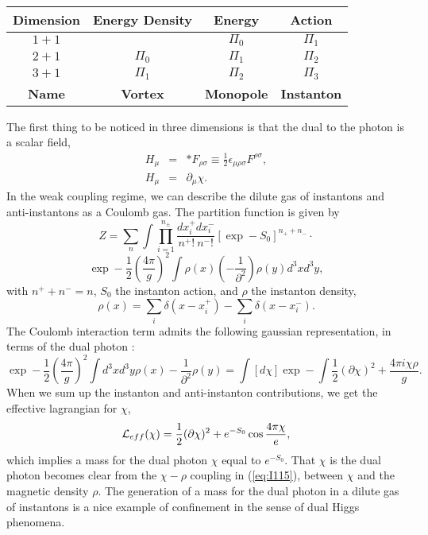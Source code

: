 \begin{center}

\begin{tabular}{|c|c|c|c|}     \hline\hline
	 {\bf Dimension}        & {\bf Energy Density}  &  {\bf Energy}  & {\bf Action}  \\ \hline
	 $1+1$                  &                       &  $\Pi_0$       & $\Pi_1$  \\ 
	 $2+1$                  & $\Pi_0$               &  $\Pi_1$       & $\Pi_2$  \\  
	 $3+1$                  & $\Pi_1$               &  $\Pi_2$       & $\Pi_3$  \\  \hline
	 {\bf Name}             & {\bf Vortex}          & {\bf Monopole} & {\bf Instanton} \\ \hline\hline


\end{tabular}
\label{tab:1}
\end{center}

  
The first thing to be noticed in three dimensions is that the
dual to the photon is a scalar field,
\begin{eqnarray}
H_{\mu} & = & * F_{\rho \sigma} \equiv \frac {1}{2}\epsilon_{\mu \rho
\sigma} F^{\rho \sigma}, \nonumber \\
H_{\mu} & = & \partial_{\mu}\chi.
\label{eq:I112}
\end{eqnarray}
In the weak coupling regime, we can describe the dilute gas of
instantons and anti-instantons as a Coulomb gas. The partition
function is given by \cite{P3d}
\[
Z= \sum_{n} \int \prod_{i=1}^{n_{\pm}} \frac {dx_i^+ dx_i^-}{n^+ ! \: n^- !}
[\exp - S_0]^{n_++n_-} \cdot \]
\begin{equation}
\exp - \frac {1}{2} \left( \frac {4\pi}{g} \right)^2 \int \rho(x)
\left( - \frac {1}{\partial^2} \right) \rho(y) d^3x d^3y,
\label{eq:I113}
\end{equation}
with $n^++n^-=n$, $S_0$ the instanton action, and $\rho$ the
instanton density,
\begin{equation}
\rho(x) = \sum_i \delta(x-x_i^+) - \sum_i \delta (x-x_i^-).
\label{eq:I114}
\end{equation}
The Coulomb interaction term admits the following gaussian
representation, in terms of the dual photon \cite{P3d}:
\begin{equation}
\exp - \frac {1}{2} \left( \frac {4\pi}{g} \right)^2 \int d^3x d^3y
\rho(x) - \frac {1}{\partial^2}\rho(y) = \int [d\chi] \exp - \int
\frac {1}{2} (\partial \chi)^2 + \frac {4\pi i\chi \rho}{g}.
\label{eq:I115}
\end{equation}
When we sum up the instanton and anti-instanton contributions, we
get the effective lagrangian for $\chi$,
\begin{equation}
{\cal L}_{eff}(\chi) = \frac {1}{2} (\partial \chi)^2+e^{-S_0}
\cos \frac {4\pi \chi}{e},
\label{eq:I116}
\end{equation}
which implies a mass for the dual photon $\chi$ equal to
$e^{-S_0}$. That $\chi$ is the dual photon becomes clear from the
$\chi- \rho$ coupling in (\ref{eq:I115}), between $\chi$ and the magnetic
density $\rho$. The generation of a mass for the dual photon in a
dilute gas of instantons is a nice example of confinement in the
sense of dual Higgs phenomena.  
  
